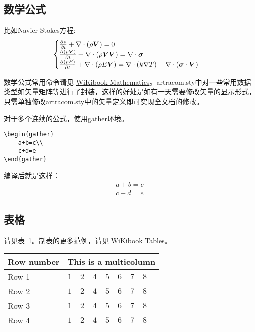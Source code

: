 \subsection{数学公式}

比如Navier-Stokes方程:
\begin{equation} \label{eq:ns}
    \begin{cases}
        \frac{\partial \rho}{\partial t} + \nabla\cdot(\rho\boldsymbol{V}) = 0 \\
        \frac{\partial (\rho\boldsymbol{V})}{\partial t} + \nabla\cdot(\rho\boldsymbol{V}\boldsymbol{V}) = \nabla\cdot\boldsymbol{\mathsf{\sigma}}\\
        \frac{\partial (\rho E)}{\partial t} + \nabla\cdot(\rho E\boldsymbol{V}) = \nabla\cdot(k\nabla T) + \nabla\cdot(\boldsymbol{\mathsf{\sigma}}\cdot\boldsymbol{V})
    \end{cases}
\end{equation}

数学公式常用命令请见 \href{https://en.wikibooks.org/wiki/LaTeX/Mathematics}{WiKibook Mathematics}。artracom.sty中对一些常用数据类型如矢量矩阵等进行了封装，这样的好处是如有一天需要修改矢量的显示形式，只需单独修改artracom.sty中的矢量定义即可实现全文档的修改。


对于多个连续的公式，使用gather环境。
\begin{verbatim}
\begin{gather}
	a+b=c\\
	c+d=e
\end{gather} 
\end{verbatim} 
编译后就是这样：
\begin{gather}
	a+b=c\\
	c+d=e
\end{gather} 


\subsection{表格}

请见表~\ref{tab:sample}。制表的更多范例，请见 \href{https://en.wikibooks.org/wiki/LaTeX/Tables}{WiKibook Tables}。
\begin{table}[!htbp]
    \centering
    \footnotesize%
    \setlength{\tabcolsep}{4pt}%
    \renewcommand{\arraystretch}{1.2}%
    \begin{tabular}{lcccccccc}
        \hline
        Row number & \multicolumn{8}{c}{This is a multicolumn} \\
        \hline
        Row 1 & $1$ & $2$ & $4$ & $5$ & $6$ & $7$ & $8$\\
        Row 2 & $1$ & $2$ & $4$ & $5$ & $6$ & $7$ & $8$\\
        Row 3 & $1$ & $2$ & $4$ & $5$ & $6$ & $7$ & $8$\\
        Row 4 & $1$ & $2$ & $4$ & $5$ & $6$ & $7$ & $8$\\
        \hline
    \end{tabular}
    \label{tab:sample}
\end{table}

